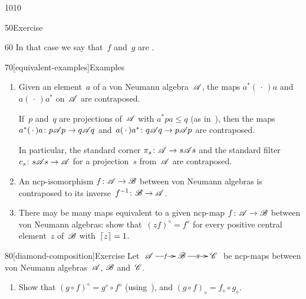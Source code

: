\begin{parsec}{1010}
\begin{point}{50}{Exercise}
\begin{point}{60}
In that case we say that~$f$ and~$g$ are .%
\end{point}
\end{point}
\begin{point}{70}[equivalent-examples]{Examples}%
\begin{enumerate}
\item
Given an element~$a$ of a von Neumann algebra~$\mathscr{A}$,
the maps $a^*(\,\cdot\,)a$ and~$a(\,\cdot\,)a^*$
on~$\mathscr{A}$ are contraposed.

If~$p$ and~$q$ are projections of~$\mathscr{A}$
with $a^*pa\leq q$
(as in~),
then the maps
$a^*(\,\cdot\,)a \colon p\mathscr{A} p\to q\mathscr{A} q$
and~$a(\,\cdot\,)a^*\colon q\mathscr{A} q \to p\mathscr{A} p$
are contraposed.

In particular,
the standard corner $\pi_s\colon \mathscr{A}\to s \mathscr{A} s$
and the standard filter $c_s\colon s\mathscr{A} s\to \mathscr{A}$
for a projection~$s$ from~$\mathscr{A}$
are contraposed.
\item
An ncp-isomorphism $f\colon \mathscr{A}\to\mathscr{B}$
between von Neumann algebras
is contraposed to its inverse~$f^{-1}\colon \mathscr{B}\to\mathscr{A}$.
\item
There may be many maps equivalent to a given ncp-map $f\colon \mathscr{A}\to\mathscr{B}$
between von Neumann algebras:
show that~$(zf)^\diamond = f^\diamond$
for every positive central element~$z$ of~$\mathscr{B}$ with~$\left\lceil z\right\rceil=1$.
\end{enumerate}
\spacingfix%
\end{point}%
\begin{point}{80}[diamond-composition]{Exercise}%
Let $\xymatrix{
	\scrA\ar[r]|-{f}&
	\scrB\ar[r]|-{g}&
\scrC}$
be ncp-maps between von Neumann algebras~$\mathscr{A}$,
$\mathscr{B}$ and~$\mathscr{C}$.
\begin{enumerate}
\item
Show that $(g\circ f)^\diamond = g^\diamond\circ f^\diamond$
(using~),
and $(g\circ f)_\diamond = f_\diamond\circ g_\diamond$.


\end{enumerate}
\end{point}
\end{parsec}
